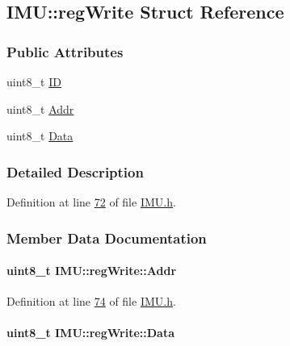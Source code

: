 \hypertarget{struct_i_m_u_1_1reg_write}{
\subsection{IMU::regWrite Struct Reference}
\label{struct_i_m_u_1_1reg_write}
}
\subsubsection*{Public Attributes}
\begin{DoxyCompactItemize}
\item 
uint8\_\-t \hyperlink{struct_i_m_u_1_1reg_write_aca32b881a20ec7adc84956176aa65a7b}{ID}
\item 
uint8\_\-t \hyperlink{struct_i_m_u_1_1reg_write_a814db0ab3fab7c9d45784c8f0eba74c5}{Addr}
\item 
uint8\_\-t \hyperlink{struct_i_m_u_1_1reg_write_ace45ec9e1c4549b73f81a62d409da7d9}{Data}
\end{DoxyCompactItemize}


\subsubsection{Detailed Description}


Definition at line \hyperlink{_i_m_u_8h_source_l00072}{72} of file \hyperlink{_i_m_u_8h_source}{IMU.h}.



\subsubsection{Member Data Documentation}
\hypertarget{struct_i_m_u_1_1reg_write_a814db0ab3fab7c9d45784c8f0eba74c5}{
\paragraph[{Addr}]{\setlength{\rightskip}{0pt plus 5cm}uint8\_\-t {\bf IMU::regWrite::Addr}}\hfill}
\label{struct_i_m_u_1_1reg_write_a814db0ab3fab7c9d45784c8f0eba74c5}


Definition at line \hyperlink{_i_m_u_8h_source_l00074}{74} of file \hyperlink{_i_m_u_8h_source}{IMU.h}.

\hypertarget{struct_i_m_u_1_1reg_write_ace45ec9e1c4549b73f81a62d409da7d9}{
\paragraph[{Data}]{\setlength{\rightskip}{0pt plus 5cm}uint8\_\-t {\bf IMU::regWrite::Data}}\hfill}
\label{struct_i_m_u_1_1reg_write_ace45ec9e1c4549b73f81a62d409da7d9}


